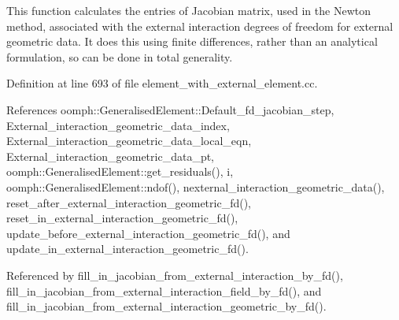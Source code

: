This function calculates the entries of Jacobian matrix, used in the Newton method, associated with the external interaction degrees of freedom for external geometric data. It does this using finite differences, rather than an analytical formulation, so can be done in total generality. 

Definition at line 693 of file element\+\_\+with\+\_\+external\+\_\+element.\+cc.



References oomph\+::\+Generalised\+Element\+::\+Default\+\_\+fd\+\_\+jacobian\+\_\+step, External\+\_\+interaction\+\_\+geometric\+\_\+data\+\_\+index, External\+\_\+interaction\+\_\+geometric\+\_\+data\+\_\+local\+\_\+eqn, External\+\_\+interaction\+\_\+geometric\+\_\+data\+\_\+pt, oomph\+::\+Generalised\+Element\+::get\+\_\+residuals(), i, oomph\+::\+Generalised\+Element\+::ndof(), nexternal\+\_\+interaction\+\_\+geometric\+\_\+data(), reset\+\_\+after\+\_\+external\+\_\+interaction\+\_\+geometric\+\_\+fd(), reset\+\_\+in\+\_\+external\+\_\+interaction\+\_\+geometric\+\_\+fd(), update\+\_\+before\+\_\+external\+\_\+interaction\+\_\+geometric\+\_\+fd(), and update\+\_\+in\+\_\+external\+\_\+interaction\+\_\+geometric\+\_\+fd().



Referenced by fill\+\_\+in\+\_\+jacobian\+\_\+from\+\_\+external\+\_\+interaction\+\_\+by\+\_\+fd(), fill\+\_\+in\+\_\+jacobian\+\_\+from\+\_\+external\+\_\+interaction\+\_\+field\+\_\+by\+\_\+fd(), and fill\+\_\+in\+\_\+jacobian\+\_\+from\+\_\+external\+\_\+interaction\+\_\+geometric\+\_\+by\+\_\+fd().

\mbox{\label{classoomph_1_1ElementWithExternalElement_adbdc1df03ef1c5f24d51c5ad6061c672}} 
